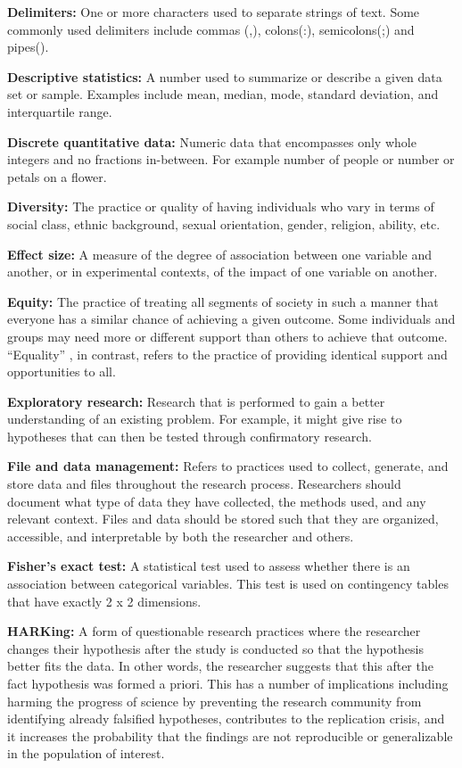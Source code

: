\documentclass[
]{book}
\begin{document}
\textbf{Delimiters:} One or more characters used to separate strings of text. Some commonly used delimiters include commas (,), colons(:), semicolons(;) and pipes(\textbar).

\textbf{Descriptive statistics:} A number used to summarize or describe a given data set or sample. Examples include mean, median, mode, standard deviation, and interquartile range.

\textbf{Discrete quantitative data:} Numeric data that encompasses only whole integers and no fractions in-between. For example number of people or number or petals on a flower.

\textbf{Diversity:} The practice or quality of having individuals who vary in terms of social class, ethnic background, sexual orientation, gender, religion, ability, etc.

\textbf{Effect size:} A measure of the degree of association between one variable and another, or in experimental contexts, of the impact of one variable on another.

\textbf{Equity:} The practice of treating all segments of society in such a manner that everyone has a similar chance of achieving a given outcome. Some individuals and groups may need more or different support than others to achieve that outcome. ``Equality'' , in contrast, refers to the practice of providing identical support and opportunities to all.

\textbf{Exploratory research:} Research that is performed to gain a better understanding of an existing problem. For example, it might give rise to hypotheses that can then be tested through confirmatory research.

\textbf{File and data management:} Refers to practices used to collect, generate, and store data and files throughout the research process. Researchers should document what type of data they have collected, the methods used, and any relevant context. Files and data should be stored such that they are organized, accessible, and interpretable by both the researcher and others.

\textbf{Fisher's exact test:} A statistical test used to assess whether there is an association between categorical variables. This test is used on contingency tables that have exactly 2 x 2 dimensions.

\textbf{HARKing:} A form of questionable research practices where the researcher changes their hypothesis after the study is conducted so that the hypothesis better fits the data. In other words, the researcher suggests that this after the fact hypothesis was formed a priori. This has a number of implications including harming the progress of science by preventing the research community from identifying already falsified hypotheses, contributes to the replication crisis, and it increases the probability that the findings are not reproducible or generalizable in the population of interest.
\end{document}
